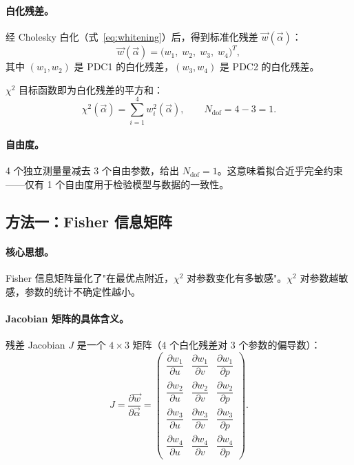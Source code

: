 \documentclass[a4paper, 11pt]{article}
\begin{document}
\paragraph{白化残差。}
经 Cholesky 白化（式~\eqref{eq:whitening}）后，得到标准化残差 $\vec{w}(\vec{\alpha})$：
\begin{equation}
  \vec{w}(\vec{\alpha}) = \bigl(w_1,\; w_2,\; w_3,\; w_4\bigr)^T,
  \label{eq:whitened_residuals}
\end{equation}
其中 $(w_1, w_2)$ 是 PDC1 的白化残差，$(w_3, w_4)$ 是 PDC2 的白化残差。

$\chi^2$ 目标函数即为白化残差的平方和：
\begin{equation}
  \chi^2(\vec{\alpha}) = \sum_{i=1}^{4} w_i^2(\vec{\alpha}), \qquad N_\mathrm{dof} = 4 - 3 = 1.
  \label{eq:chi2_recall}
\end{equation}

\paragraph{自由度。} 4 个独立测量量减去 3 个自由参数，给出 $N_\mathrm{dof} = 1$。这意味着拟合近乎完全约束——仅有 1 个自由度用于检验模型与数据的一致性。

\subsection{方法一：Fisher 信息矩阵}
\label{sec:fisher}

\paragraph{核心思想。}
Fisher 信息矩阵量化了"在最优点附近，$\chi^2$ 对参数变化有多敏感"。$\chi^2$ 对参数越敏感，参数的统计不确定性越小。

\paragraph{Jacobian 矩阵的具体含义。}
残差 Jacobian $J$ 是一个 $4 \times 3$ 矩阵（4 个白化残差对 3 个参数的偏导数）：
\begin{equation}
  J = \frac{\partial \vec{w}}{\partial \vec{\alpha}} =
  \begin{pmatrix}
    \dfrac{\partial w_1}{\partial u} & \dfrac{\partial w_1}{\partial v} & \dfrac{\partial w_1}{\partial p} \\[8pt]
    \dfrac{\partial w_2}{\partial u} & \dfrac{\partial w_2}{\partial v} & \dfrac{\partial w_2}{\partial p} \\[8pt]
    \dfrac{\partial w_3}{\partial u} & \dfrac{\partial w_3}{\partial v} & \dfrac{\partial w_3}{\partial p} \\[8pt]
    \dfrac{\partial w_4}{\partial u} & \dfrac{\partial w_4}{\partial v} & \dfrac{\partial w_4}{\partial p}
  \end{pmatrix}.
  \label{eq:jacobian_explicit}
\end{equation}
\end{document}
